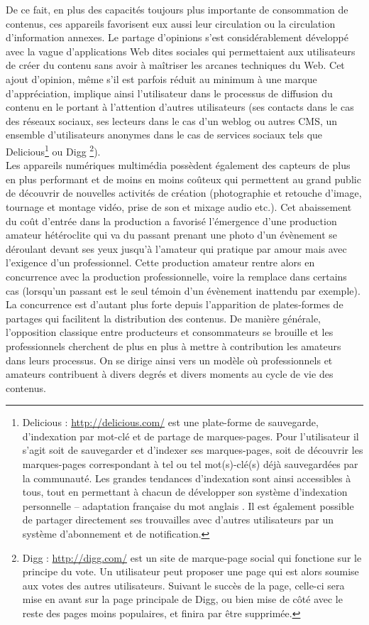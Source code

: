 De ce fait, en plus des capacités toujours plus importante de consommation de contenus, ces appareils favorisent eux aussi leur circulation ou la circulation d’information annexes. 
Le partage d’opinions s’est considérablement développé avec la vague d'applications Web dites sociales qui permettaient aux utilisateurs de créer du contenu sans avoir à maîtriser les arcanes techniques du Web. 
Cet ajout d’opinion, même s’il est parfois réduit au minimum à une marque d'appréciation, implique ainsi l’utilisateur dans le processus de diffusion du contenu en le portant à l'attention d'autres utilisateurs (ses contacts dans le cas des réseaux sociaux, ses lecteurs dans le cas d'un weblog ou autres CMS, un ensemble d'utilisateurs anonymes dans le cas de services sociaux tels que Delicious\footnote{Delicious : \url{http://delicious.com/} est une plate-forme de sauvegarde, d'indexation par mot-clé et de partage de marques-pages. Pour l'utilisateur il s'agit soit de sauvegarder et d'indexer ses marques-pages, soit de découvrir les marques-pages correspondant à tel ou tel mot(s)-clé(s) déjà sauvegardées par la communauté. Les grandes tendances d'indexation sont ainsi accessibles à tous, tout en permettant à chacun de développer son système d'indexation personnelle -- adaptation française du mot anglais . Il est également possible de partager directement ses trouvailles avec d'autres utilisateurs par un système d'abonnement et de notification.} ou Digg \footnote{Digg : \url{http://digg.com/} est un site de marque-page social qui fonctione sur le principe du vote. Un utilisateur peut proposer une page qui est alors soumise aux votes des autres utilisateurs. Suivant le succès de la page, celle-ci sera mise en avant sur la page principale de Digg, ou bien mise de côté avec le reste des pages moins populaires, et finira par être supprimée.}).\\


Les appareils numériques multimédia possèdent également des capteurs de plus en plus performant et de moins en moins coûteux qui permettent au grand public de découvrir de nouvelles activités de création (photographie et retouche d’image, tournage et montage vidéo, prise de son et mixage audio etc.).
Cet abaissement du coût d’entrée dans la production a favorisé l'émergence d’une production amateur hétéroclite qui va du passant prenant une photo d’un évènement se déroulant devant ses yeux jusqu’à l’amateur qui pratique par amour mais avec l'exigence d’un professionnel. 
Cette production amateur rentre alors en concurrence avec la production professionnelle, voire la remplace dans certains cas (lorsqu’un passant est le seul témoin d’un évènement inattendu par exemple). 
La concurrence est d'autant plus forte depuis l’apparition de plates-formes de partages qui facilitent la distribution des contenus. 
De manière générale, l’opposition classique entre producteurs et consommateurs se brouille et les professionnels cherchent de plus en plus à mettre à contribution les amateurs dans leurs processus. 
On se dirige ainsi vers un modèle où professionnels et amateurs contribuent à divers degrés et divers moments au cycle de vie des contenus.


